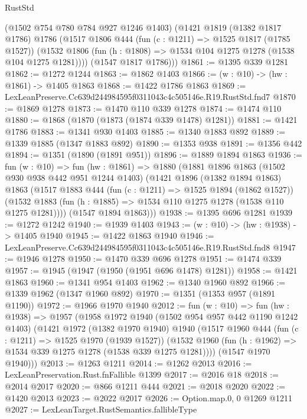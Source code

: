 \begin{lexlean}{RustStd}
\begin{coremodule}
      (@1502 @754 @780 @784 @927 @1246 @1403)
      (@1421
        @1819
        (@1382 @1817 @1786)
        @1786
        (@1517
          @1806
          @444
          (fun (c : @1211) => @1525 @1817 (@1785 @1527))
          (@1532 @1806 (fun (h : @1808) => @1534 @104 @1275 @1278 (@1538 @104 @1275 @1281))))
        (@1547 @1817 @1786)))
@1861 := @1395 @339 @1281
@1862 := @1272 @1244
@1863 := @1862 @1403
@1866 := (w : @10) -> (hw : @1861) -> @1405 @1863
@1868 := @1422 @1786 @1863
@1869 := LexLeanPreserve.Cc639d244984595f0311043c4c505146e.R19.RustStd.fnd7
@1870 := @1869 @1278
@1873 := @1470 @110 @339 @1278
@1874 := @1474 @110
@1880 := @1868 (@1870 (@1873 (@1874 @339 @1478) @1281))
@1881 := @1421 @1786
@1883 := @1341 @930 @1403
@1885 := @1340 @1883 @892
@1889 := @1339 @1885 (@1347 @1883 @892)
@1890 := @1353 @938
@1891 := @1356 @442
@1894 := @1351 (@1890 (@1891 @951))
@1896 := @1889 @1894 @1863
@1936 := fun (w : @10) =>
  fun (hw : @1861) =>
  @1880
    (@1881
      @1896
      @1863
      (@1502 @930 @938 @442 @951 @1244 @1403)
      (@1421
        @1896
        (@1382 @1894 @1863)
        @1863
        (@1517
          @1883
          @444
          (fun (c : @1211) => @1525 @1894 (@1862 @1527))
          (@1532 @1883 (fun (h : @1885) => @1534 @110 @1275 @1278 (@1538 @110 @1275 @1281))))
        (@1547 @1894 @1863)))
@1938 := @1395 @696 @1281
@1939 := @1272 @1242
@1940 := @1939 @1403
@1943 := (w : @10) -> (hw : @1938) -> @1405 @1940
@1945 := @1422 @1863 @1940
@1946 := LexLeanPreserve.Cc639d244984595f0311043c4c505146e.R19.RustStd.fnd8
@1947 := @1946 @1278
@1950 := @1470 @339 @696 @1278
@1951 := @1474 @339
@1957 := @1945 (@1947 (@1950 (@1951 @696 @1478) @1281))
@1958 := @1421 @1863
@1960 := @1341 @954 @1403
@1962 := @1340 @1960 @892
@1966 := @1339 @1962 (@1347 @1960 @892)
@1970 := @1351 (@1353 @957 (@1891 @1190))
@1972 := @1966 @1970 @1940
@2012 := fun (w : @10) =>
  fun (hw : @1938) =>
  @1957
    (@1958
      @1972
      @1940
      (@1502 @954 @957 @442 @1190 @1242 @1403)
      (@1421
        @1972
        (@1382 @1970 @1940)
        @1940
        (@1517
          @1960
          @444
          (fun (c : @1211) => @1525 @1970 (@1939 @1527))
          (@1532 @1960 (fun (h : @1962) => @1534 @339 @1275 @1278 (@1538 @339 @1275 @1281))))
        (@1547 @1970 @1940)))
@2013 := @1263 @1211
@2014 := @1262 @2013
@2016 := LexLeanPreservation.Rust.fnFallible @1399
@2017 := @2016 @18
@2018 := @2014 @2017
@2020 := @866 @1211 @444
@2021 := @2018 @2020
@2022 := @1420 @2013
@2023 := @2022 @2017
@2026 := Option.map.{0, 0} @1269 @1211
@2027 := LexLeanTarget.RustSemantics.fallibleType

\end{coremodule}
\end{lexlean}
